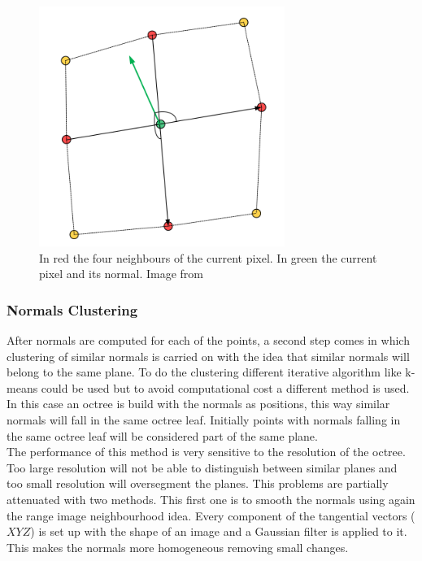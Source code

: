 \documentclass[fontsize=12pt]{article}
\begin{document}
\begin{figure}[!htbp]
  \begin{center}
      \includegraphics[width=8cm]{./images/normal_example.png}
      \caption{In red the four neighbours of the current pixel. In green the current pixel and its normal. Image from \cite{bib:planes_paper}}
    \label{fig:example_segmentation}
  \end{center}
\end{figure}

\subsubsection{Normals Clustering}

After normals are computed for each of the points, a second step comes in which clustering of similar normals is carried on with the idea that similar normals will belong to the same plane. To do the clustering different iterative algorithm like k-means could be used but to avoid computational cost a different method is used. In this case an octree is build with the normals as positions, this way similar normals will fall in the same octree leaf. Initially points with normals falling in the same octree leaf will be considered part of the same plane.\\

The performance of this method is very sensitive to the resolution of the octree. Too large resolution will not be able to distinguish between similar planes and too small resolution will oversegment the planes. This problems are partially attenuated with two methods. This first one is to smooth the normals using again the range image neighbourhood idea. Every component of the tangential vectors ($XYZ$) is set up with the shape of an image and a Gaussian filter is applied to it. This makes the normals more homogeneous removing small changes.\\
\end{document}
